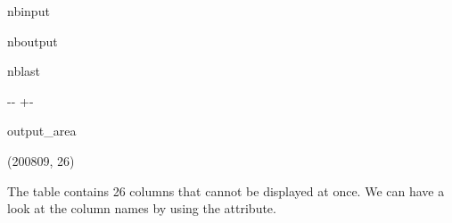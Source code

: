 \documentclass[letterpaper,10pt,english]{sphinxmanual}
\newlength\nbsphinxcodecellspacing
\begin{document}
\begin{sphinxuseclass}{nbinput}
{
\begin{sphinxVerbatim}[commandchars=\\\{\}]
\llap{\color{nbsphinxin}[20]:\,\hspace{\fboxrule}\hspace{\fboxsep}}
\end{sphinxVerbatim}
}

\end{sphinxuseclass}
\begin{sphinxuseclass}{nboutput}
\begin{sphinxuseclass}{nblast}
{

\kern-\sphinxverbatimsmallskipamount\kern-\baselineskip
\kern+\FrameHeightAdjust\kern-\fboxrule
\vspace{\nbsphinxcodecellspacing}

\begin{sphinxuseclass}{output_area}
\begin{sphinxuseclass}{}


\begin{sphinxVerbatim}[commandchars=\\\{\}]
\llap{\color{nbsphinxout}[20]:\,\hspace{\fboxrule}\hspace{\fboxsep}}(200809, 26)
\end{sphinxVerbatim}



\end{sphinxuseclass}
\end{sphinxuseclass}
}

\end{sphinxuseclass}
\end{sphinxuseclass}
\sphinxAtStartPar
The  table contains 26 columns that cannot be displayed at once. We can have a look at the column names by using the  attribute.
\end{document}
